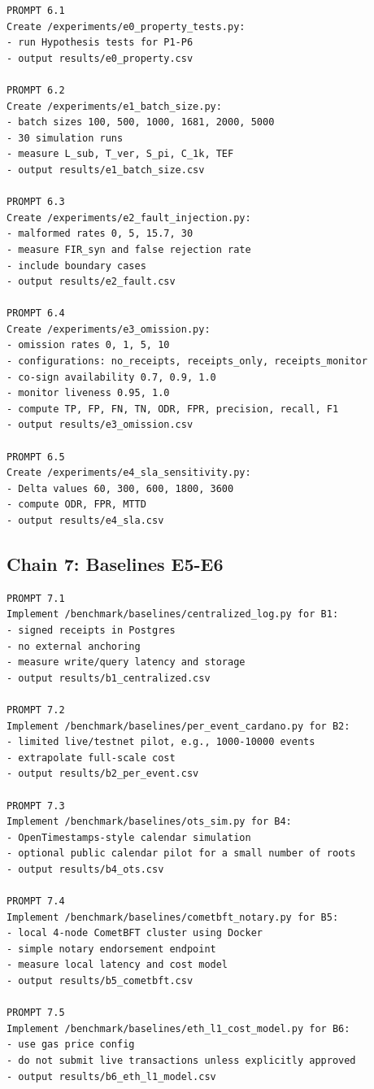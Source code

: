 \documentclass[journal]{IEEEtran}
\begin{document}
\begin{lstlisting}[language={}, basicstyle=\ttfamily\scriptsize]
PROMPT 6.1
Create /experiments/e0_property_tests.py:
- run Hypothesis tests for P1-P6
- output results/e0_property.csv

PROMPT 6.2
Create /experiments/e1_batch_size.py:
- batch sizes 100, 500, 1000, 1681, 2000, 5000
- 30 simulation runs
- measure L_sub, T_ver, S_pi, C_1k, TEF
- output results/e1_batch_size.csv

PROMPT 6.3
Create /experiments/e2_fault_injection.py:
- malformed rates 0, 5, 15.7, 30
- measure FIR_syn and false rejection rate
- include boundary cases
- output results/e2_fault.csv

PROMPT 6.4
Create /experiments/e3_omission.py:
- omission rates 0, 1, 5, 10
- configurations: no_receipts, receipts_only, receipts_monitor
- co-sign availability 0.7, 0.9, 1.0
- monitor liveness 0.95, 1.0
- compute TP, FP, FN, TN, ODR, FPR, precision, recall, F1
- output results/e3_omission.csv

PROMPT 6.5
Create /experiments/e4_sla_sensitivity.py:
- Delta values 60, 300, 600, 1800, 3600
- compute ODR, FPR, MTTD
- output results/e4_sla.csv
\end{lstlisting}

\subsection*{Chain 7: Baselines E5-E6}

\begin{lstlisting}[language={}, basicstyle=\ttfamily\scriptsize]
PROMPT 7.1
Implement /benchmark/baselines/centralized_log.py for B1:
- signed receipts in Postgres
- no external anchoring
- measure write/query latency and storage
- output results/b1_centralized.csv

PROMPT 7.2
Implement /benchmark/baselines/per_event_cardano.py for B2:
- limited live/testnet pilot, e.g., 1000-10000 events
- extrapolate full-scale cost
- output results/b2_per_event.csv

PROMPT 7.3
Implement /benchmark/baselines/ots_sim.py for B4:
- OpenTimestamps-style calendar simulation
- optional public calendar pilot for a small number of roots
- output results/b4_ots.csv

PROMPT 7.4
Implement /benchmark/baselines/cometbft_notary.py for B5:
- local 4-node CometBFT cluster using Docker
- simple notary endorsement endpoint
- measure local latency and cost model
- output results/b5_cometbft.csv

PROMPT 7.5
Implement /benchmark/baselines/eth_l1_cost_model.py for B6:
- use gas price config
- do not submit live transactions unless explicitly approved
- output results/b6_eth_l1_model.csv
\end{lstlisting}
\end{document}
